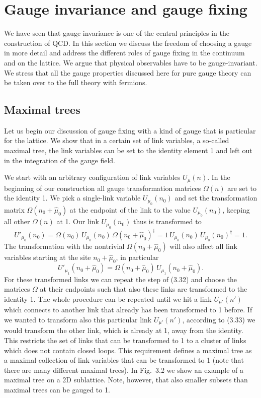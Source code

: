 \section{Gauge invariance and gauge fixing}

We have seen that gauge invariance is one of the central principles in the
construction of QCD. In this section we discuss the freedom of choosing a gauge
in more detail and address the different roles of gauge fixing in the continuum
and on the lattice. We argue that physical observables have to be
gauge-invariant. We stress that all the gauge properties discussed here for
pure gauge theory can be taken over to the full theory with fermions.

\subsection{Maximal trees}

Let us begin our discussion of gauge fixing with a kind of gauge that is
particular for the lattice. We show that in a certain set of link variables, a
so-called maximal tree, the link variables can be set to the identity element
1 and left out in the integration of the gauge field.

We start with an arbitrary configuration of link variables $U_\mu(n)$. In the
beginning of our construction all gauge transformation matrices $\Omega(n)$ are
set to the identity 1. We pick a single-link variable $U_{\mu_0}(n_0)$ and set
the transformation matrix $\Omega(n_0 + \hat\mu_0)$ at the endpoint of the link
to the value $U_{\mu_0}(n_0)$, keeping all other $\Omega(n)$ at 1. Our link
$U_{\mu_0}(n_0)$ thus is transformed to
\begin{equation}
  U'_{\mu_0}(n_0)
  = \Omega(n_0)\,U_{\mu_0}(n_0)\,\Omega(n_0+\hat\mu_0)^\dagger
  = 1\,U_{\mu_0}(n_0)\,U_{\mu_0}(n_0)^\dagger = 1 .
\end{equation}
The transformation with the nontrivial $\Omega(n_0+\hat\mu_0)$ will also affect
all link variables starting at the site $n_0+\hat\mu_0$, in particular
\begin{equation}
  U'_{\mu_1}(n_0+\hat\mu_0) = \Omega(n_0+\hat\mu_0)\,U_{\mu_1}(n_0+\hat\mu_0) .
\end{equation}
For these transformed links we can repeat the step of (3.32) and choose the
matrices $\Omega$ at their endpoints such that also these links are transformed
to the identity 1. The whole procedure can be repeated until we hit a link
$U_{\mu'}(n')$ which connects to another link that already has been transformed
to 1 before. If we wanted to transform also this particular link
$U_{\mu'}(n')$, according to (3.33) we would transform the other link, which is
already at 1, away from the identity. This restricts the set of links that can
be transformed to 1 to a cluster of links which does not contain closed loops.
This requirement defines a maximal tree as a maximal collection of link
variables that can be transformed to 1 (note that there are many different
maximal trees). In Fig.~3.2 we show an example of a maximal tree on a 2D
sublattice. Note, however, that also smaller subsets than maximal trees can be
gauged to 1.

